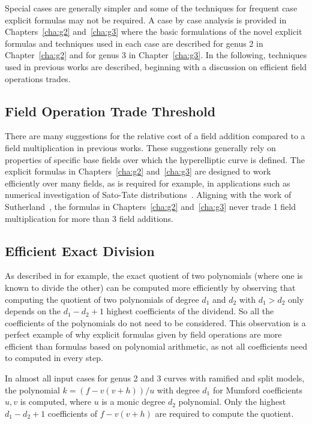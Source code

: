Special cases are generally simpler and some of the techniques for frequent case
explicit formulas may not be required. A case by case analysis is provided in
Chapters~\ref{cha:g2} and~\ref{cha:g3} where the basic formulations of the novel
explicit formulas and techniques used in each case are described for genus 2 in
Chapter~\ref{cha:g2} and for genus 3 in Chapter~\ref{cha:g3}. In the following,
techniques used in previous works are described, beginning with a discussion on
efficient field operations trades.


\subsection{Field Operation Trade Threshold}\label{sec:trades} 

There are many suggestions for the relative cost of a field addition compared to
a field multiplication in previous works. These suggestions generally rely on
properties of specific base fields over which the hyperelliptic curve is
defined. The explicit formulas in Chapters~\ref{cha:g2} and~\ref{cha:g3} are
designed to work efficiently over many fields, as is required for example, in
applications such as numerical investigation of Sato-Tate
distributions~\cite{Sutherland_sato_2016}. Aligning with the work of
Sutherland~\cite{Sutherland_g3_2019,Sutherland_sato_2016}, the formulas in
Chapters~\ref{cha:g2} and~\ref{cha:g3} never trade 1 field multiplication for
more than 3 field additions.


\subsection{Efficient Exact Division} 
\label{sec:exactdiv}
As described in \cite{MCA_2003} for example, the exact quotient of two
polynomials (where one is known to divide the other) can be computed more
efficiently by observing that computing the quotient of two polynomials of
degree $d_1$ and $d_2$ with $d_1 > d_2$ only depends on the $d_1 - d_2 + 1$
highest coefficients of the dividend.  So all the coefficients of
the polynomials do not need to be considered. This observation is a perfect
example of why explicit formulas given by field operations are more efficient
than formulas based on polynomial arithmetic, as not all coefficients need to
computed in every step.

In almost all input cases for genus 2 and 3 curves with ramified and split
models, the polynomial $k = (f - v(v +h))/u$ with degree $d_1$ for Mumford
coefficients $u,v$ is computed, where $u$ is a monic degree $d_2$ polynomial.
Only the highest $d_1 - d_2 + 1$ coefficients of $f - v(v + h)$ are required to
compute the quotient. 


